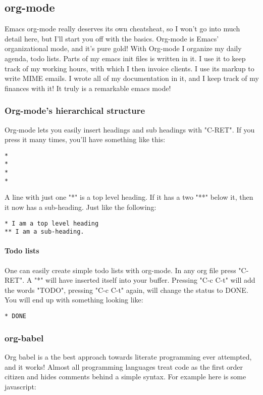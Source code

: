 \documentclass[11pt]{article}
\begin{document}
\subsection{org-mode}
\label{sec:orgheadline16}
Emacs org-mode really deserves its own cheatsheat, so I won't go into much detail here, but I'll start you off with the basics.  Org-mode is Emacs' organizational mode, and it's pure gold!  With Org-mode I organize my daily agenda, todo lists. Parts of my emacs init files is written in it.  I use it to keep track of my working hours, with which I then invoice clients.  I use its markup to write MIME emails.  I wrote all of my documentation in it, and I keep track of my finances with it!  It truly is a remarkable emacs mode!
\subsubsection{Org-mode's hierarchical structure}
\label{sec:orgheadline13}
Org-mode lets you easily insert headings and sub headings with "C-RET".  If you press it many times, you'll have something like this:

\begin{verbatim}
*
*
*
*
\end{verbatim}

A line with just one "*" is a top level heading.  If it has a two "**" below it, then it now has a sub-heading.  Just like the following:
\begin{verbatim}
* I am a top level heading
** I am a sub-heading.
\end{verbatim}

\paragraph{Todo lists}
\label{sec:orgheadline12}
One can easily create simple todo lists with org-mode.  In any org file press "C-RET".  A "*" will have inserted itself into your buffer.  Pressing "C-c C-t" will add the words "TODO",  pressing "C-c C-t" again, will change the status to DONE.  You will end up with something looking like:

\begin{verbatim}
* DONE
\end{verbatim}


\subsubsection{org-babel}
\label{sec:orgheadline15}
Org babel is a the best approach towards literate programming ever attempted, and it works!  Almost all programming languages treat code as the first order citizen and hides comments behind a simple syntax.  For example here is some javascript:
\end{document}
